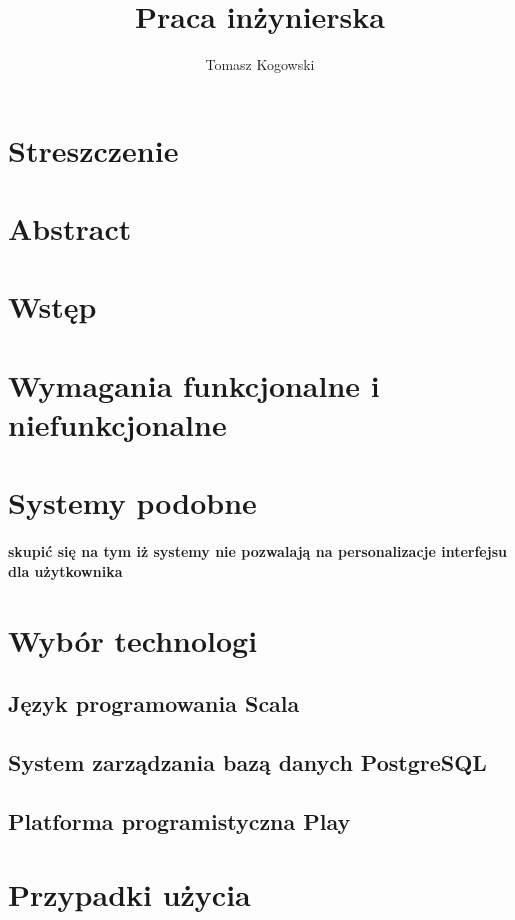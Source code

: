 \documentclass[a4paper,12pt,twoside]{article}
\title{Praca inżynierska}
\author{Tomasz Kogowski}
\begin{document}

\newpage 
\section*{Streszczenie}
\newpage 
\section*{Abstract}

\newpage

\newpage
\tableofcontents
 
\newpage
\section{Wstęp}  
\newpage
\section{Wymagania funkcjonalne i niefunkcjonalne}  
\newpage
\section{Systemy podobne}  
\paragraph{skupić się na tym iż systemy nie pozwalają na personalizacje interfejsu dla użytkownika}
\newpage
\section{Wybór technologi}
\subsection{Język programowania Scala}
\subsection{System zarządzania bazą danych PostgreSQL}  
\subsection{Platforma programistyczna Play}
\newpage
\section{Przypadki użycia}
\end{document}
